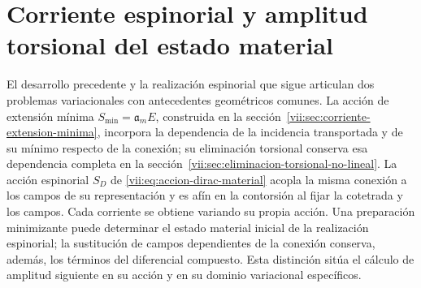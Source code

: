 
\section{Corriente espinorial y amplitud torsional del estado material}
\label{vii:sec:corriente-espinorial-densidad}

El desarrollo precedente y la realización espinorial que sigue articulan
dos problemas variacionales con antecedentes geométricos comunes. La
acción de extensión mínima \(S_{\min}=\mathfrak a_m E\), construida en
la sección~\ref{vii:sec:corriente-extension-minima}, incorpora la
dependencia de la incidencia transportada y de su mínimo respecto de la
conexión; su eliminación torsional conserva esa dependencia completa en
la sección~\ref{vii:sec:eliminacion-torsional-no-lineal}. La acción
espinorial \(S_D\) de \eqref{vii:eq:accion-dirac-material} acopla la
misma conexión a los campos de su representación y es afín en la
contorsión al fijar la cotetrada y los campos. Cada corriente se obtiene
variando su propia acción. Una preparación minimizante puede determinar
el estado material inicial de la realización espinorial; la sustitución
de campos dependientes de la conexión conserva, además, los términos
del diferencial compuesto. Esta distinción sitúa el cálculo de amplitud
siguiente en su acción y en su dominio variacional específicos.

